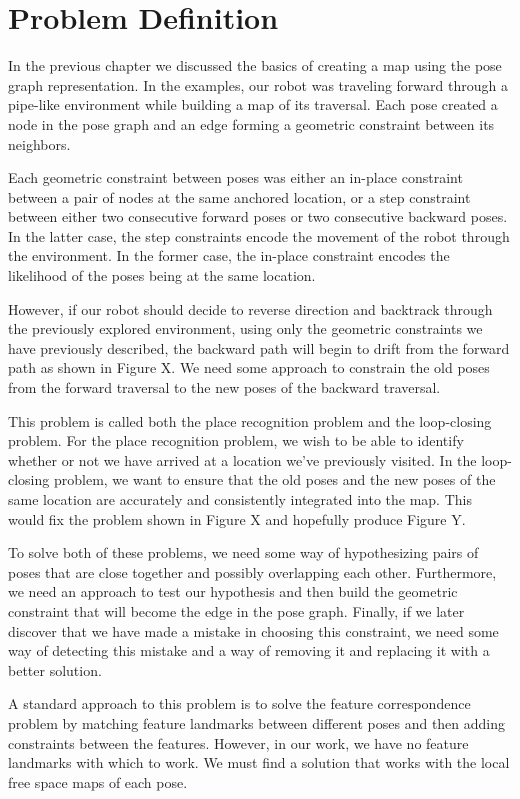 
\section{Problem Definition}

In the previous chapter we discussed the basics of creating a map using the pose graph representation.  In the examples, our robot was traveling forward through a pipe-like environment while building a map of its traversal.  Each pose created a node in the pose graph and an edge forming a geometric constraint between its neighbors.

Each geometric constraint between poses was either an in-place constraint between a pair of nodes at the same anchored location, or a step constraint between either two consecutive forward poses or two consecutive backward poses.  In the latter case, the step constraints encode the movement of the robot through the environment.   In the former case, the in-place constraint encodes the likelihood of the poses being at the same location.

However, if our robot should decide to reverse direction and backtrack through the previously explored environment, using only the geometric constraints we have previously described, the backward path will begin to drift from the forward path as shown in Figure X.  We need some approach to constrain the old poses from the forward traversal to the new poses of the backward traversal.

This problem is called both the place recognition problem and the loop-closing problem.  For the place recognition problem, we wish to be able to identify whether or not we have arrived at a location we've previously visited.  In the loop-closing problem, we want to ensure that the old poses and the new poses of the same location are accurately and consistently integrated into the map.  This would fix the problem shown in Figure X and hopefully produce Figure Y.

To solve both of these problems, we need some way of hypothesizing pairs of poses that are close together and possibly overlapping each other.  Furthermore, we need an approach to test our hypothesis and then build the geometric constraint that will become the edge in the pose graph.  Finally, if we later discover that we have made a mistake in choosing this constraint, we need some way of detecting this mistake and a way of removing it and replacing it with a better solution.

A standard approach to this problem is to solve the feature correspondence problem by matching feature landmarks between different poses and then adding constraints between the features.  However, in our work, we have no feature landmarks with which to work.  We must find a solution that works with the local free space maps of each pose.

